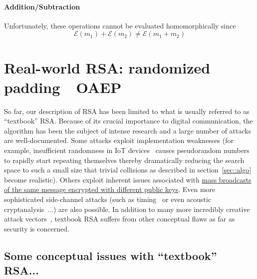 \documentclass{article}
\begin{document}
\paragraph{Addition/Subtraction}  Unfortunately, these operations cannot be evaluated homomorphically since
\begin{equation*}
\mathcal{E}(m_1) + \mathcal{E}(m_2) \neq \mathcal{E}(m_1 + m_2)
\end{equation*}

\section{Real-world RSA: randomized padding~\textemdash~OAEP}
\label{sec::padding}

\noindent So far, our description of RSA has been limited to what is usually referred to as ``textbook'' RSA.  Because of its crucial importance to digital communication, the algorithm has been the subject of intense research and a large number of attacks are well-documented. Some attacks exploit implementation weaknesses (for example, insufficient randomness in IoT devices~\cite{randomness} causes pseudorandom numbers to rapidly start repeating themselves thereby dramatically reducing the search space to such a small size that trivial collisions as described in section~\ref{sec::algo} become realistic). Others exploit inherent issues associated with \href{https://en.wikipedia.org/wiki/Coppersmith\%27s_attack#H\%C3\%A5stad's_broadcast_attack}{mass broadcasts of the same message encrypted with different public keys}. Even more sophisticated side-channel attacks (such as timing~\cite{sideChannel:timing} or even acoustic cryptanalysis~\cite{sideChannel:acoustics}...) are also possible.  In addition to many more incredibly creative attack vectors~\cite{boneh}, textbook RSA suffers from other conceptual flaws as far as security is concerned.

\subsection{Some conceptual issues with ``textbook'' RSA...}
\end{document}
